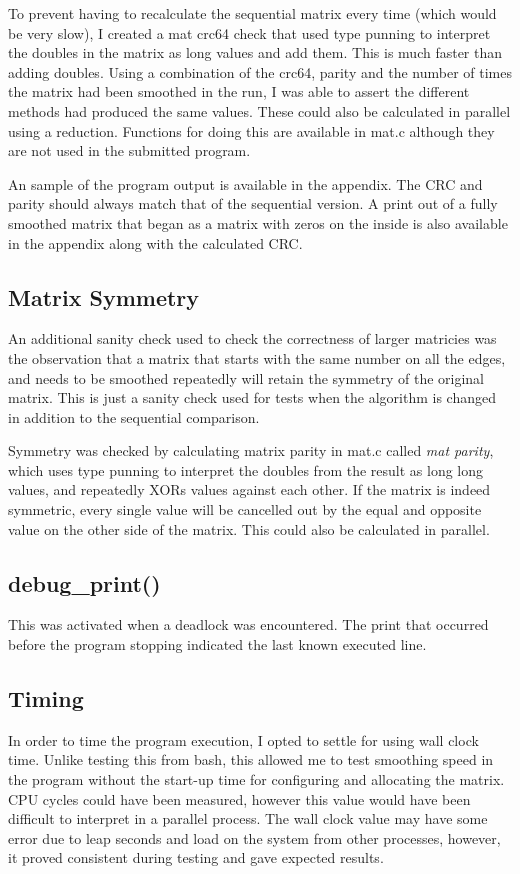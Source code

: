 \documentclass[a4paper,10pt]{report}
\begin{document}
To prevent having to recalculate the sequential matrix every time (which would be very slow), I created a mat crc64 check that used type punning to interpret the doubles in the matrix as long values and add them. This is much faster than adding doubles. Using a combination of the crc64, parity and the number of times the matrix had been smoothed in the run, I was able to assert the different methods had produced the same values. These could also be calculated in parallel using a reduction. Functions for doing this are available in mat.c although they are not used in the submitted program.

An sample of the program output is available in the appendix. The CRC and parity should always match that of the sequential version. A print out of a fully smoothed matrix that began as a matrix with zeros on the inside is also available in the appendix along with the calculated CRC.
\subsection{Matrix Symmetry}
An additional sanity check used to check the correctness of larger matricies was the observation that a matrix that starts with the same number on all the edges, and needs to be smoothed repeatedly will retain the symmetry of the original matrix. This is just a sanity check used for tests when the algorithm is changed in addition to the sequential comparison.

Symmetry was checked by calculating matrix parity in mat.c called \emph{mat parity}, which uses type punning to interpret the doubles from the result as long long values, and repeatedly XORs values against each other. If the matrix is indeed symmetric, every single value will be cancelled out by the equal and opposite value on the other side of the matrix. This could also be calculated in parallel.
\subsection{debug\_print()}
This was activated when a deadlock was encountered. The print that occurred before the program stopping indicated the last known executed line.
\subsection{Timing}
In order to time the program execution, I opted to settle for using wall clock time. Unlike testing this from bash, this allowed me to test smoothing speed in the program without the start-up time for configuring and allocating the matrix. CPU cycles could have been measured, however this value would have been difficult to interpret in a parallel process. The wall clock value may have some error due to leap seconds and load on the system from other processes, however, it proved consistent during testing and gave expected results.
\end{document}
